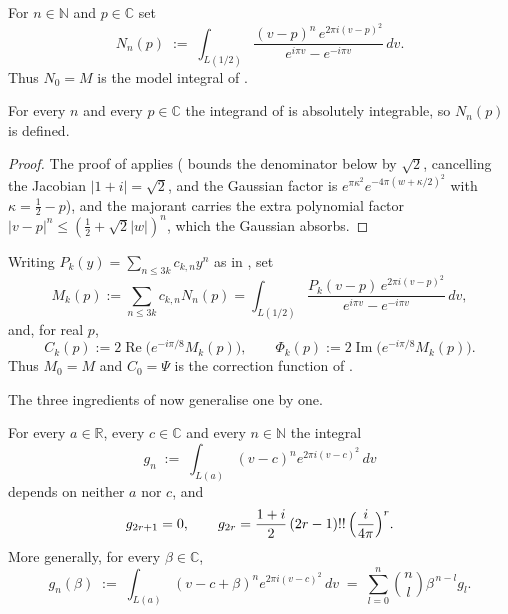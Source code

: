 \begin{definition}
\label{def:rsg_moment}
For $n\in\mathbb{N}$ and $p\in\mathbb{C}$ set
\[
  N_{n}(p)\;:=\;\int_{L(1/2)}\frac{(v-p)^{n}\,e^{2\pi i(v-p)^{2}}}{e^{i\pi v}-e^{-i\pi v}}\,dv .
\]
Thus $N_{0}=M$ is the model integral of .
\end{definition}

\begin{lemma}
\label{lem:rsg_moment_conv}
For every $n$ and every $p\in\mathbb{C}$ the integrand of  is absolutely
integrable, so $N_{n}(p)$ is defined.
\end{lemma}

\begin{proof}
The proof of  applies ( bounds the
denominator below by $\sqrt2$, cancelling the Jacobian $\lvert1+i\rvert=\sqrt2$, and the Gaussian
factor is $e^{\pi\kappa^{2}}e^{-4\pi(w+\kappa/2)^{2}}$ with $\kappa=\tfrac12-p$), and
the majorant carries the extra polynomial factor
$\lvert v-p\rvert^{n}\le(\tfrac12+\sqrt2\lvert w\rvert)^{n}$, which the Gaussian absorbs.
\end{proof}

\begin{definition}
\label{def:rsg_correction}
Writing $P_{k}(y)=\sum_{n\le3k}c_{k,n}y^{n}$ as in , set
\[
  M_{k}(p):=\sum_{n\le3k}c_{k,n}N_{n}(p)
   =\int_{L(1/2)}\frac{P_{k}(v-p)\,e^{2\pi i(v-p)^{2}}}{e^{i\pi v}-e^{-i\pi v}}\,dv ,
\]
and, for real $p$,
\[
  C_{k}(p):=2\operatorname{Re}\bigl(e^{-i\pi/8}M_{k}(p)\bigr),\qquad
  \Phi_{k}(p):=2\operatorname{Im}\bigl(e^{-i\pi/8}M_{k}(p)\bigr).
\]
Thus $M_{0}=M$ and $C_{0}=\Psi$ is the correction function of .
\end{definition}

The three ingredients of  now generalise one by one.

\begin{lemma}
\label{lem:rsg_gauss}
For every $a\in\mathbb{R}$, every $c\in\mathbb{C}$ and every $n\in\mathbb{N}$ the integral
\[
  g_{n}\;:=\;\int_{L(a)}(v-c)^{n}e^{2\pi i(v-c)^{2}}\,dv
\]
depends on neither $a$ nor $c$, and
\[
  g_{2r+1}=0,\qquad g_{2r}=\frac{1+i}{2}\,(2r-1)!!\,\Bigl(\frac{i}{4\pi}\Bigr)^{r} .
\]
More generally, for every $\beta\in\mathbb{C}$,
\[
  g_{n}(\beta)\;:=\;\int_{L(a)}(v-c+\beta)^{n}e^{2\pi i(v-c)^{2}}\,dv
   \;=\;\sum_{l=0}^{n}\binom nl\beta^{\,n-l}g_{l}.
\]
\end{lemma}

